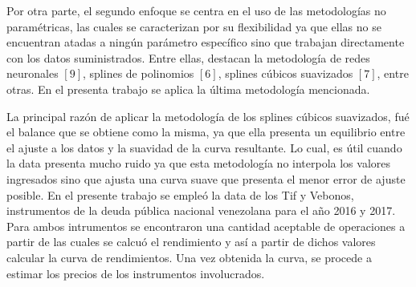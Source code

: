 \vspace{0.5cm}

\hspace{0.4cm}Por otra parte, el segundo enfoque se centra en el uso de las metodolog\'ias no param\'etricas, las cuales se caracterizan por su flexibilidad ya que ellas no se encuentran atadas a ning\'un par\'ametro espec\'ifico sino que trabajan directamente con los datos suministrados. Entre ellas, destacan la metodolog\'ia de redes neuronales $[9]$, splines de polinomios $[6]$, splines c\'ubicos suavizados $[7]$, entre otras. En el presenta trabajo se aplica la \'ultima metodolog\'ia mencionada.

\vspace{0.5cm}

\hspace{0.4cm} La principal raz\'on de aplicar la metodolog\'ia de los splines c\'ubicos suavizados, fu\'e el balance que se obtiene como la misma, ya que ella presenta un equilibrio entre el ajuste a los datos y la suavidad de la curva resultante. Lo cual, es \'util cuando la data presenta mucho ruido ya que esta metodolog\'ia no interpola los valores ingresados sino que ajusta una curva suave que presenta el menor error de ajuste posible. En el presente trabajo se emple\'o la data de los Tif y Vebonos, instrumentos de la deuda p\'ublica nacional venezolana para el a\~no 2016 y 2017. Para ambos intrumentos se encontraron una cantidad aceptable de operaciones a partir de las cuales se calcu\'o el rendimiento y as\'i a partir de dichos valores calcular la curva de rendimientos. Una vez obtenida la curva, se procede a estimar los precios de los instrumentos involucrados.

